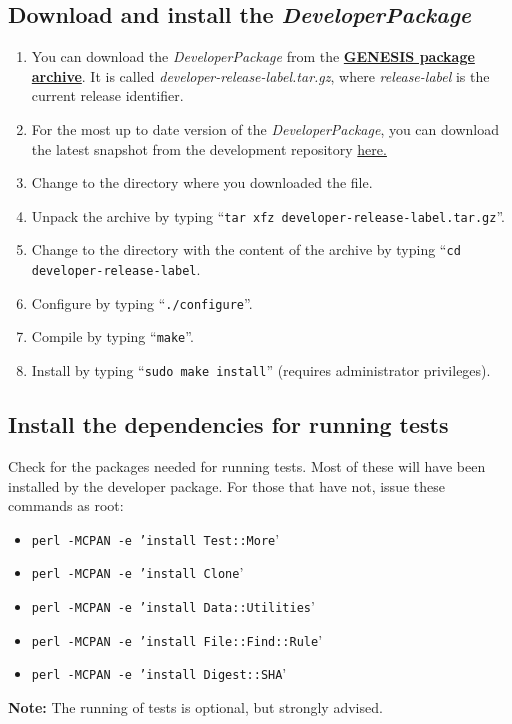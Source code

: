 \documentclass[12pt]{article}
\begin{document}
\subsection*{Download and install the {\it DeveloperPackage}}

\begin{enumerate}
   \item You can download the {\it DeveloperPackage} from the \href{http://repo-genesis3.cbi.utsa.edu/src/}{\bf GENESIS package archive}. It is called {\it developer-release-label.tar.gz}, where {\it release-label} is the current release identifier.
   \item For the most up to date version of the {\it DeveloperPackage}, you can download the latest snapshot from the development repository \href{http://repo-genesis3.cbi.utsa.edu/src/}{here.}
   \item Change to the directory where you downloaded the file.
   \item Unpack the archive by typing ``{\tt tar xfz developer-release-label.tar.gz}''.
   \item Change to the directory with the content of the archive by typing ``{\tt cd developer-release-label}.
   \item Configure by typing ``{\tt ./configure}''.
   \item Compile by typing ``{\tt make}''.
   \item Install by typing ``{\tt sudo make install}''  (requires administrator privileges). 
\end{enumerate}

\subsection*{Install the dependencies for running tests}

Check for the packages needed for running tests.  Most of these will
have been installed  by the developer package. For those that have not,
issue these commands as root:

      \begin{itemize}
         \item {\tt perl -MCPAN -e 'install Test::More}'
         \item {\tt perl -MCPAN -e 'install Clone}'
         \item {\tt perl -MCPAN -e 'install Data::Utilities}'
         \item {\tt perl -MCPAN -e 'install File::Find::Rule}'
         \item {\tt perl -MCPAN -e 'install Digest::SHA}' 
      \end{itemize}
      {\bf Note:} The running of tests is optional, but strongly advised.
\end{document}
